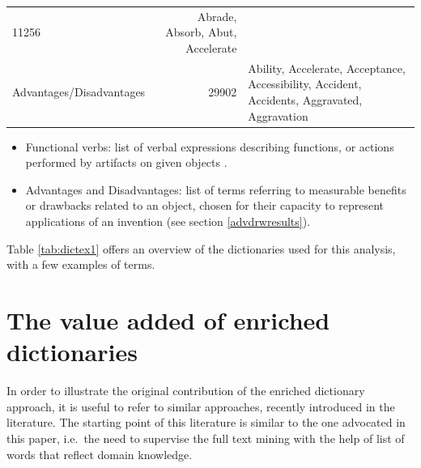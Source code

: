 \documentclass[]{book}
\begin{document}
\begin{longtable}[]{@{}lrl@{}}
\begin{minipage}[t]{0.12\columnwidth}
11256\strut
\end{minipage} & \begin{minipage}[t]{0.62\columnwidth}\raggedright\strut
Abrade, Absorb, Abut, Accelerate\strut
\end{minipage}\tabularnewline
\begin{minipage}[t]{0.17\columnwidth}\raggedright\strut
Advantages/Disadvantages\strut
\end{minipage} & \begin{minipage}[t]{0.12\columnwidth}\raggedleft\strut
29902\strut
\end{minipage} & \begin{minipage}[t]{0.62\columnwidth}\raggedright\strut
Ability, Accelerate, Acceptance, Accessibility, Accident, Accidents,
Aggravated, Aggravation\strut
\end{minipage}\tabularnewline
\bottomrule
\end{longtable}

\begin{itemize}
\item
  Functional verbs: list of verbal expressions describing functions, or
  actions performed by artifacts on given objects
  \citep{fantoni2013automatic, apreda2016functional}.
\item
  Advantages and Disadvantages: list of terms referring to measurable
  benefits or drawbacks related to an object, chosen for their capacity
  to represent applications of an invention (see section
  \ref{advdrwresults}).
\end{itemize}

Table \ref{tab:dictex1} offers an overview of the dictionaries used for
this analysis, with a few examples of terms.

\section{The value added of enriched
dictionaries}\label{the-value-added-of-enriched-dictionaries}

In order to illustrate the original contribution of the enriched
dictionary approach, it is useful to refer to similar approaches,
recently introduced in the literature. The starting point of this
literature is similar to the one advocated in this paper, i.e.~the need
to supervise the full text mining with the help of list of words that
reflect domain knowledge.
\end{document}
